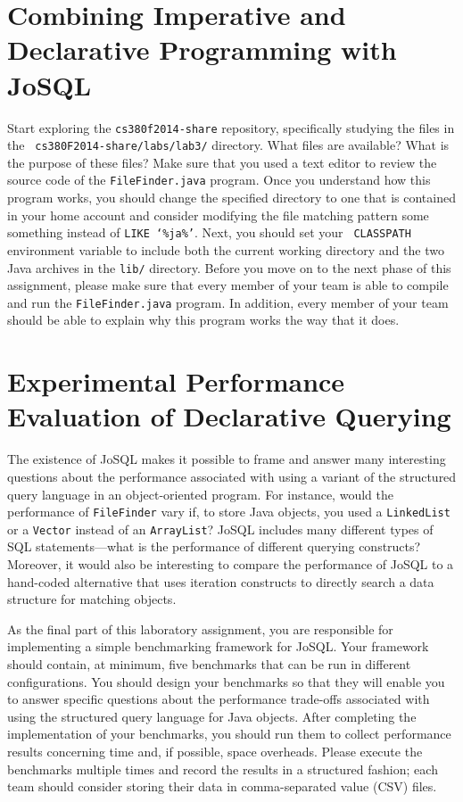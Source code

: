 \section*{Combining Imperative and Declarative Programming with JoSQL}

\begin{sloppypar}

  Start exploring the {\tt cs380f2014-share} repository, specifically studying the files in the {\tt
    cs380F2014-share/labs/lab3/} directory. What files are available? What is the purpose of these files? Make sure that
  you used a text editor to review the source code of the {\tt FileFinder.java} program. Once you understand how this
  program works, you should change the specified directory to one that is contained in your home account and consider
  modifying the file matching pattern some something instead of {\tt LIKE `\%ja\%'}. Next, you should set your {\tt
    CLASSPATH} environment variable to include both the current working directory and the two Java archives in the {\tt lib/}
  directory. Before you move on to the next phase of this assignment, please make sure that every member of your team is
  able to compile and run the {\tt FileFinder.java} program. In addition, every member of your team should be able to
  explain why this program works the way that it does.

\end{sloppypar}

\section*{Experimental Performance Evaluation of Declarative Querying}
\vspace*{-.2in}


The existence of JoSQL makes it possible to frame and answer many interesting questions about the performance associated
with using a variant of the structured query language in an object-oriented program.  For instance, would the
performance of {\tt FileFinder} vary if, to store Java objects, you used a {\tt LinkedList} or a {\tt Vector} instead of
an {\tt ArrayList}?  JoSQL includes many different types of SQL statements---what is the performance of different
querying constructs?  Moreover, it would also be interesting to compare the performance of JoSQL to a hand-coded
alternative that uses iteration constructs to directly search a data structure for matching objects.

As the final part of this laboratory assignment, you are responsible for implementing a simple benchmarking framework
for JoSQL.  Your framework should contain, at minimum, five benchmarks that can be run in different configurations.  You
should design your benchmarks so that they will enable you to answer specific questions about the performance trade-offs
associated with using the structured query language for Java objects.  After completing the implementation of your
benchmarks, you should run them to collect performance results concerning time and, if possible, space overheads.
Please execute the benchmarks multiple times and record the results in a structured fashion; each team should
consider storing their data in comma-separated value (CSV) files.

